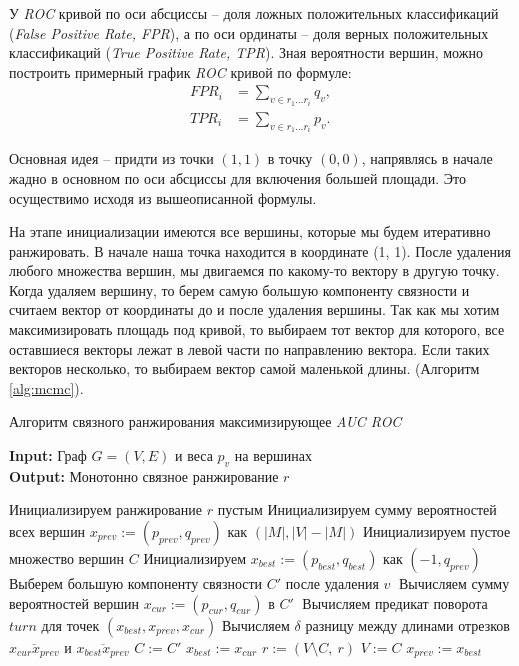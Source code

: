 У \emph{ROC} кривой по оси абсциссы -- доля ложных положительных классификаций
(\emph{False Positive Rate, FPR}), а по оси ординаты -- доля верных
положительных классификаций (\emph{True Positive Rate, TPR}).  Зная вероятности
вершин, можно построить примерный график \emph{ROC} кривой по формуле:
\begin{align*}
    FPR_i &=\sum_{v \in r_1 \ldots r_i}{q_v},\\
    TPR_i &= \sum_{v \in r_1 \ldots r_i}{p_v}.
\end{align*}

Основная идея -- придти из точки $(1, 1)$ в точку $(0, 0)$, напрявлясь в начале
жадно в основном по оси абсциссы для включения большей площади.  Это
осуществимо исходя из вышеописанной формулы.

На этапе инициализации имеются все вершины, которые мы будем итеративно
ранжировать. В начале наша точка находится в координате (1, 1).  После удаления
любого множества вершин, мы двигаемся по какому-то вектору в другую точку.
Когда удаляем вершину, то берем самую большую компоненту связности и считаем
вектор от координаты до и после удаления вершины.  Так как мы хотим
максимизировать площадь под кривой, то выбираем тот вектор для которого, все
оставшиеся векторы лежат в левой части по направлению вектора.  Если таких
векторов несколько, то выбираем вектор самой маленькой длины.
(Алгоритм \ref{alg:mcmc}).

\begin{algorithm}
    \caption{Алгоритм связного ранжирования максимизирующее \emph{AUC ROC}}
    \label{alg:mcmc}
    \hspace*{\algorithmicindent} \textbf{Input:}  Граф $G=(V, E)$ и веса $p_v$ на вершинах\\
    \hspace*{\algorithmicindent} \textbf{Output:} Монотонно связное ранжирование $r$
    \begin{algorithmic}[1]
        \State Инициализируем ранжирование $r$ пустым
        \State Инициализируем сумму вероятностей всех вершин
        $x_{prev} := (p_{prev}, q_{prev})$ как $(|M|, |V| - |M|)$
            \State Инициализируем пустое множество вершин $C$
            \State Инициализируем $x_{best} := (p_{best}, q_{best})$ как $(-1, q_{prev})$
                \State Выберем большую компоненту связности $C'$ после удаления $v\;$
                \State Вычисляем сумму вероятностей вершин
                    $x_{cur} := (p_{cur}, q_{cur})$ в $C'\;$
                \State Вычисляем предикат поворота $turn$ для точек
                    $(x_{best}, x_{prev}, x_{cur})$
                \State Вычисляем $\delta$ разницу между длинами отрезков
                $\overline{x_{cur}x_{prev}}$ и $\overline{x_{best}x_{prev}}$
                    \State $C := C'$
                    \State $x_{best} := x_{cur}$
                \EndIf
            \EndFor
            \State $r := (V \setminus C,~r)$
            \State $V := C$
            \State $x_{prev} := x_{best}$
        \EndWhile
    \end{algorithmic}
\end{algorithm}

